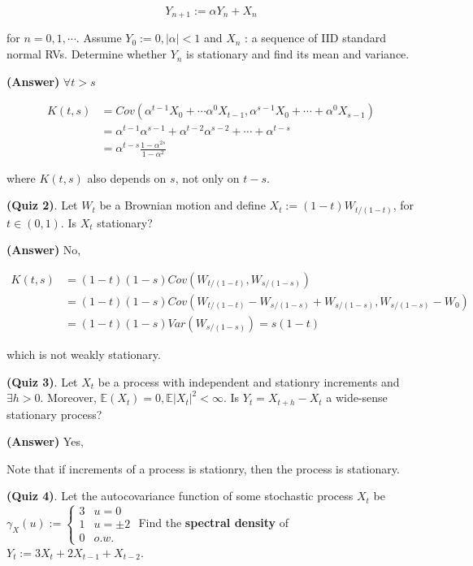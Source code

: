 \documentclass[12pt]{article}
\theoremstyle{nonumberbreak}
\begin{document}
$$
Y_{n+1} := \alpha Y_n + X_n
$$

for $n=0, 1, \cdots$. Assume $Y_0 := 0, |\alpha| < 1$ and $X_n$ : a sequence of IID standard normal RVs. Determine whether $Y_n$ is stationary and find its mean and variance.


\textbf{(Answer)} $\forall t > s$

$$
\begin{aligned}
K(t,s) &= Cov(\alpha^{t-1} X_0 + \cdots \alpha^0 X_{t-1}, \alpha^{s-1} X_0 + \cdots + \alpha^0 X_{s-1}) \\[8pt]
&= \alpha^{t-1} \alpha^{s-1} + \alpha^{t-2} \alpha^{s-2} + \cdots + \alpha^{t-s} \\[8pt]
&= \alpha^{t-s} \frac{1-\alpha^{2s}}{1-\alpha^2}
\end{aligned}
$$

where $K(t,s)$ also depends on $s$, not only on $t-s$.




\textbf{(Quiz 2)}. Let $W_t$ be a Brownian motion and define $X_t := (1-t) W_{t/(1-t)}$, for $t \in (0,1)$. Is $X_t$ stationary? 

\textbf{(Answer)} No,

$$
\begin{aligned}
K(t,s) &= (1-t)(1-s) Cov(W_{t/(1-t)}, W_{s/(1-s)}) \\[8pt]
&= (1-t)(1-s) Cov(W_{t/(1-t)} - W_{s/(1-s)} + W_{s/(1-s)}, W_{s/(1-s)} - W_0) \\[8pt]
&= (1-t)(1-s) Var(W_{s/(1-s)}) = s(1-t)
\end{aligned}
$$

which is not weakly stationary. 


\textbf{(Quiz 3)}. Let $X_t$ be a process with independent and stationry increments and $\exists h>0$. Moreover, $\mathbb{E}(X_t) = 0, \mathbb{E}|X_t|^2 < \infty$. Is $Y_t = X_{t+h} - X_t$ a wide-sense stationary process? 

\textbf{(Answer)} Yes,

Note that if increments of a process is stationry, then the process is stationary.



\textbf{(Quiz 4)}. Let the autocovariance function of some stochastic process $X_t$ be $\gamma_X(u) := \begin{cases} 3 & u=0 \\ 1 & u=\pm2 \\ 0 & o.w. \end{cases}$ Find the \textbf{spectral density} of $Y_t := 3X_t + 2X_{t-1} + X_{t-2}$. 
\end{document}
